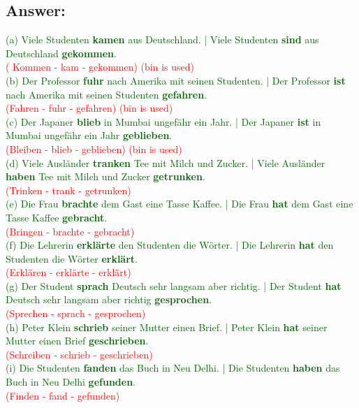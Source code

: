 \documentclass[a4paper,12pt]{article}
\begin{document}
\subsection*{Answer:}
\textcolor{darkgreen}{(a) Viele Studenten \textbf{kamen} aus Deutschland. | Viele Studenten \textbf{sind} aus Deutschland \textbf{gekommen}.}\\ \textcolor{red}{( Kommen - kam - gekommen) (bin is used)}\\
\textcolor{darkgreen}{(b) Der Professor \textbf{fuhr} nach Amerika mit seinen Studenten. | Der Professor \textbf{ist} nach Amerika mit seinen Studenten \textbf{gefahren}.}\\ \textcolor{red}{(Fahren - fuhr - gefahren) (bin is used)}\\
\textcolor{darkgreen}{(c) Der Japaner \textbf{blieb} in Mumbai ungefähr ein Jahr. | Der Japaner \textbf{ist} in Mumbai ungefähr ein Jahr \textbf{geblieben}.}\\ \textcolor{red}{(Bleiben - blieb - geblieben) (bin is used)}\\
\textcolor{darkgreen}{(d) Viele Ausländer \textbf{tranken} Tee mit Milch und Zucker. | Viele Ausländer \textbf{haben} Tee mit Milch und Zucker \textbf{getrunken}.}\\ \textcolor{red}{(Trinken - trank - getrunken)}\\
\textcolor{darkgreen}{(e) Die Frau \textbf{brachte} dem Gast eine Tasse Kaffee. | Die Frau \textbf{hat} dem Gast eine Tasse Kaffee \textbf{gebracht}.}\\ \textcolor{red}{(Bringen - brachte - gebracht)}\\
\textcolor{darkgreen}{(f) Die Lehrerin \textbf{erklärte} den Studenten die Wörter. | Die Lehrerin \textbf{hat} den Studenten die Wörter \textbf{erklärt}.}\\ \textcolor{red}{(Erklären - erklärte - erklärt)}\\
\textcolor{darkgreen}{(g) Der Student \textbf{sprach} Deutsch sehr langsam aber richtig. | Der Student \textbf{hat} Deutsch sehr langsam aber richtig \textbf{gesprochen}.}\\ \textcolor{red}{(Sprechen - sprach - gesprochen)}\\
\textcolor{darkgreen}{(h) Peter Klein \textbf{schrieb} seiner Mutter einen Brief. | Peter Klein \textbf{hat} seiner Mutter einen Brief \textbf{geschrieben}.}\\ \textcolor{red}{(Schreiben - schrieb - geschrieben)}\\
\textcolor{darkgreen}{(i) Die Studenten \textbf{fanden} das Buch in Neu Delhi. | Die Studenten \textbf{haben} das Buch in Neu Delhi \textbf{gefunden}.}\\ \textcolor{red}{(Finden - fand - gefunden)}\\
\end{document}
